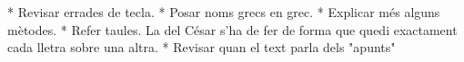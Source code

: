 * Revisar errades de tecla.
* Posar noms grecs en grec.
* Explicar més alguns mètodes.
* Refer taules. La del César s'ha de fer de forma que quedi exactament cada lletra sobre una altra.
* Revisar quan el text parla dels "apunts"